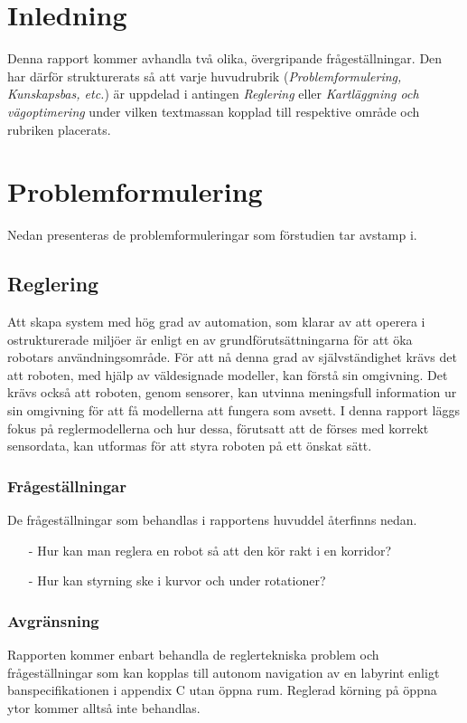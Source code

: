 \documentclass[11pt]{article}
\begin{document}
\begin{flushleft}

\section{Inledning} \label{inledning}
Denna rapport kommer avhandla två olika, övergripande frågeställningar. Den har därför strukturerats så att varje huvudrubrik (\textit{Problemformulering, Kunskapsbas, etc.}) är uppdelad i antingen \textit{Reglering} eller \textit{Kartläggning och vägoptimering} under vilken textmassan kopplad till respektive område och rubriken placerats.

\section{Problemformulering}
Nedan presenteras de problemformuleringar som förstudien tar avstamp i.
\subsection{Reglering}
Att skapa system med hög grad av automation, som klarar av att operera i ostrukturerade miljöer är enligt \cite{intro} %
 en av grundförutsättningarna för att öka robotars användningsområde. För att nå denna grad av självständighet krävs det att roboten, med hjälp av väldesignade modeller, kan förstå sin omgivning. Det krävs också att roboten, genom sensorer, kan utvinna meningsfull information ur sin omgivning för att få modellerna att fungera som avsett. I denna rapport läggs fokus på reglermodellerna och hur dessa, förutsatt att de förses med korrekt sensordata, kan utformas för att styra roboten på ett önskat sätt.

\subsubsection{Frågeställningar}
De frågeställningar som behandlas i rapportens huvuddel återfinns nedan.
\begin{itemize}
	\item [-] Hur kan man reglera en robot så att den kör rakt i en korridor?
	\item [-] Hur kan styrning ske i kurvor och under rotationer?
\end{itemize}

\subsubsection{Avgränsning}
Rapporten kommer enbart behandla de reglertekniska problem och frågeställningar som kan kopplas till autonom navigation av en labyrint enligt banspecifikationen i appendix C utan öppna rum. Reglerad körning på öppna ytor kommer alltså inte behandlas.


\end{flushleft}
\end{document}
